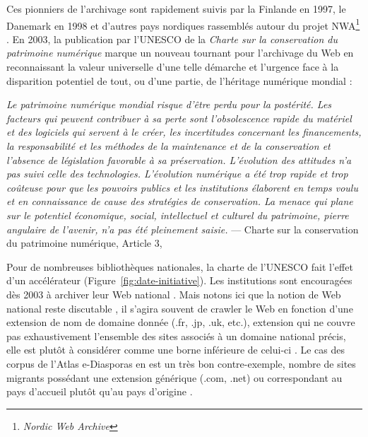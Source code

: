 \documentclass[symmetric,justified,marginals=raggedouter]{tufte-book}
\begin{document}
Ces pionniers de l'archivage sont rapidement suivis par la Finlande en 1997, le Danemark en 1998 et d'autres pays nordiques rassemblés autour du projet NWA\footnote{\RaggedOuter \textit{Nordic Web Archive}} \citep{hallgrinsson_nordic_2003}. En 2003, la publication par l'UNESCO de la \textit{Charte sur la conservation du patrimoine numérique} \citep{unesco_charter_2003} marque un nouveau tournant pour l'archivage du Web en reconnaissant la valeur universelle d'une telle démarche et l'urgence face à la disparition potentiel de tout, ou d'une partie, de l'héritage numérique mondial : \\

\begin{fullwidth}
\og\textit{Le  patrimoine  numérique  mondial  risque  d'être  perdu  pour  la  postérité.  Les  facteurs  qui  peuvent  contribuer  à  sa  perte  sont  l'obsolescence  rapide  du  matériel  et  des  logiciels  qui  servent  à  le  créer,  les  incertitudes  concernant  les  financements,  la  responsabilité  et  les  méthodes  de  la  maintenance  et  de  la  conservation et l'absence de législation favorable à sa préservation. L'évolution des attitudes n'a pas suivi celle des technologies. L'évolution numérique a été trop rapide et trop coûteuse pour que les pouvoirs publics et les institutions élaborent en temps voulu et en connaissance de cause des stratégies de conservation. La menace qui plane sur le potentiel économique, social, intellectuel et culturel du patrimoine, pierre angulaire de l'avenir, n'a pas été pleinement saisie.}\fg{} --- Charte sur la conservation du patrimoine numérique, Article 3, \citep{unesco_charter_2003}\\
\end{fullwidth}

\noindent Pour de nombreuses bibliothèques nationales, la charte de l'UNESCO fait l'effet d'un accélérateur (Figure~\ref{fig:date-initiative}). Les institutions sont encouragées dès 2003 à archiver leur Web national \citep{gomes_survey_2011}. Mais notons ici que la notion de Web national reste discutable \citep{abiteboul_first_2002}, il s'agira souvent de crawler le Web en fonction d'une extension de nom de domaine donnée (.fr, .jp, .uk, etc.), extension qui ne couvre pas exhaustivement l'ensemble des sites associés à un domaine national précis, elle est plutôt à considérer comme une borne inférieure de celui-ci \citep{koehler_analysis_1999}. Le cas des corpus de l'Atlas e-Diasporas en est un très bon contre-exemple, nombre de sites migrants possédant une extension générique (.com, .net) ou correspondant au pays d'accueil plutôt qu'au pays d'origine \citep{leclerc_cyberespace_2012}.  
\end{document}
